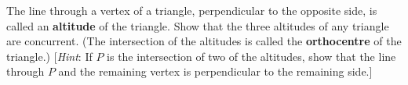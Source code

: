 \begin{multicols}{2}
\begin{supex}
The line through a vertex of a triangle, perpendicular to the opposite side, is called an \textbf{altitude} of the triangle. Show that the three altitudes of any triangle are 
concurrent. (The intersection of the altitudes is called the \textbf{orthocentre} of the triangle.) [\textit{Hint}: If $P$ is the intersection of two of the altitudes, show that the line through $P$ and the remaining vertex is perpendicular to the remaining side.]

\end{supex}
\end{multicols}
